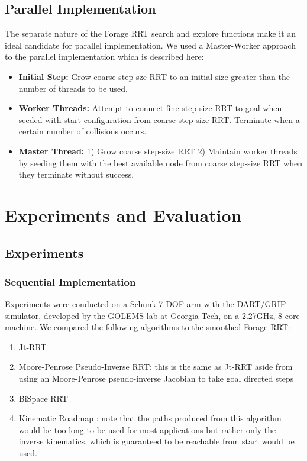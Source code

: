 \documentclass[conference]{IEEEtran}
\begin{document}
\subsection{Parallel Implementation}
The separate nature of the Forage RRT search and explore functions make it an ideal candidate for parallel implementation. We used a
Master-Worker approach to the parallel implementation which is described here:
\begin{itemize}
\item \textbf{Initial Step: } Grow coarse step-sze RRT to an initial size greater than the number of threads to be used.
\item \textbf{Worker Threads: } Attempt to connect fine step-size RRT to goal when seeded with start configuration from coarse step-size
RRT. Terminate when a certain number of collisions occurs.
\item \textbf{Master Thread: } 1) Grow coarse step-size RRT 2) Maintain worker threads by seeding them with the best available node from
coarse step-size RRT when they terminate without success.
\end{itemize}

\section{Experiments and Evaluation}
\label{sec:evaluation}
\subsection{Experiments}
\subsubsection{Sequential Implementation}
Experiments were conducted on a Schunk 7 DOF arm with the DART/GRIP simulator, developed by the GOLEMS lab at Georgia Tech, on a 2.27GHz, 8
core machine. We compared the following algorithms to the smoothed Forage RRT:
\begin{enumerate}
	\item Jt-RRT \cite{vande07}
	\item Moore-Penrose Pseudo-Inverse RRT: this is the same as Jt-RRT aside from using an Moore-Penrose pseudo-inverse Jacobian to take
	      goal directed steps
	\item BiSpace RRT \cite{diankov08}
	\item Kinematic Roadmap \cite{ahuactzin99}: note that the paths produced from this algorithm would be too long to be used for most
	      applications but rather only the inverse kinematics, which is guaranteed to be reachable from start would be used.
\end{enumerate}
\end{document}
